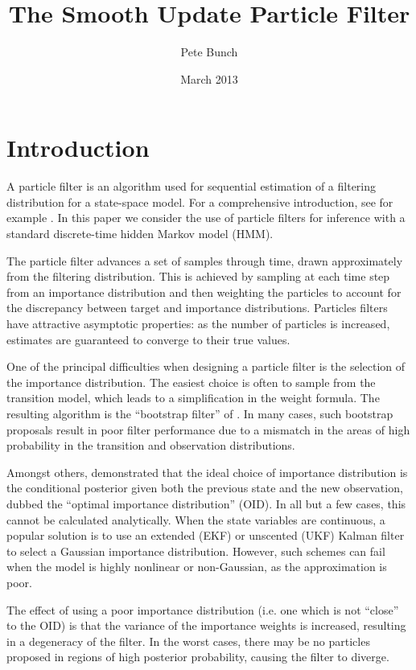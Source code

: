 \documentclass[a4paper,10pt]{article}
\title{The Smooth Update Particle Filter}
\author{Pete Bunch}
\date{March 2013}
\begin{document}
\maketitle

\begin{abstract}
\end{abstract}

\section{Introduction}

A particle filter is an algorithm used for sequential estimation of a filtering distribution for a state-space model. For a comprehensive introduction, see for example \cite{Cappe2007,Doucet2009}. In this paper we consider the use of particle filters for inference with a standard discrete-time hidden Markov model (HMM).

The particle filter advances a set of samples through time, drawn approximately from the filtering distribution. This is achieved by sampling at each time step from an importance distribution and then weighting the particles to account for the discrepancy between target and importance distributions. Particles filters have attractive asymptotic properties: as the number of particles is increased, estimates are guaranteed to converge to their true values.

One of the principal difficulties when designing a particle filter is the selection of the importance distribution. The easiest choice is often to sample from the transition model, which leads to a simplification in the weight formula. The resulting algorithm is the ``bootstrap filter'' of \cite{Gordon1993}. In many cases, such bootstrap proposals result in poor filter performance due to a mismatch in the areas of high probability in the transition and observation distributions.

Amongst others, \cite{Doucet2000a} demonstrated that the ideal choice of importance distribution is the conditional posterior given both the previous state and the new observation, dubbed the ``optimal importance distribution'' (OID). In all but a few cases, this cannot be calculated analytically. When the state variables are continuous, a popular solution is to use an extended (EKF) or unscented (UKF) Kalman filter to select a Gaussian importance distribution. However, such schemes can fail when the model is highly nonlinear or non-Gaussian, as the approximation is poor.

The effect of using a poor importance distribution (i.e. one which is not ``close'' to the OID) is that the variance of the importance weights is increased, resulting in a degeneracy of the filter. In the worst cases, there may be no particles proposed in regions of high posterior probability, causing the filter to diverge.
\end{document}
